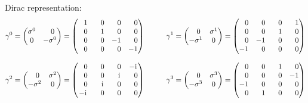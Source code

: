 			\noindent
			Dirac representation:
			\begin{equation}
				\begin{aligned}
					\gamma^0
					= \left( \begin{matrix}
					\sigma^0 & \M0 \\
					0 &  -\sigma^0
					\end{matrix} \right)
					= \left( \begin{matrix}
					\M 1 & \M 0 & \M 0 & \M 0 \\
					\M 0 & \M 1 & \M 0 & \M 0 \\
					\M 0 & \M 0 &   -1 & \M 0 \\
					\M 0 & \M 0 & \M 0 &   -1 \\
					\end{matrix} \right)
					&\hsp
					\gamma^1
					= \left( \begin{matrix}
					\M0 & \sigma^1 \\
					-\sigma^1 &  0
					\end{matrix} \right)
					= \left( \begin{matrix}
					\M 0 & \M 0 & \M 0 & \M 1 \\
					\M 0 & \M 0 & \M 1 & \M 0 \\
					\M 0 &   -1 & \M 0 & \M 0 \\
					-1 & \M 0 & \M 0 & \M 0 \\
					\end{matrix} \right) \\[8pt]
					\gamma^2
					= \left( \begin{matrix}
					\M0 & \sigma^2 \\
					-\sigma^2 &  0
					\end{matrix} \right)
					= \left( \begin{matrix}
					\M 0 & \M 0 & \M 0 &  -\i \\
					\M 0 & \M 0 & \M\i & \M 0 \\
					\M 0 & \M\i & \M 0 & \M 0 \\
					-\i & \M 0 & \M 0 & \M 0 \\
					\end{matrix} \right)
					&\hsp
					\gamma^3
					= \left( \begin{matrix}
					\M 0 & \sigma^3 \\
					-\sigma^3 &  0
					\end{matrix} \right)
					= \left( \begin{matrix}
					\M 0 & \M 0 & \M 1 & \M 0 \\
					\M 0 & \M 0 & \M 0 &   -1 \\
					-1 & \M 0 & \M 0 & \M 0 \\
					\M 0 & \M 1 & \M 0 & \M 0 \\
					\end{matrix} \right) \\
				\end{aligned}
			\end{equation}

